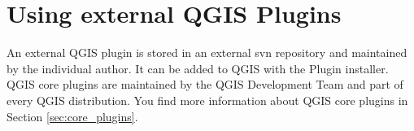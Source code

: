 \section{Using external QGIS Plugins}\label{sec:external_plugins}

\updatedisclaimer

An external QGIS plugin is stored in an external svn repository and 
maintained by the individual author. It can be added to QGIS with the Plugin 
installer. QGIS core plugins are maintained by the QGIS Development Team 
and part of every QGIS distribution. You find more information about QGIS 
core plugins in Section \ref{sec:core_plugins}.

\newpage
